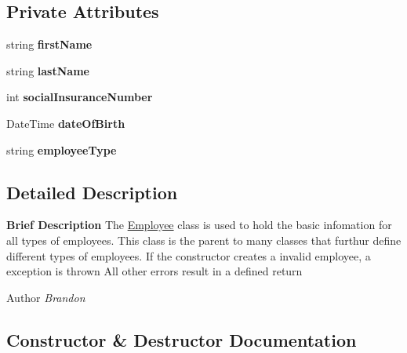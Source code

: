 \subsection*{Private Attributes}
\begin{DoxyCompactItemize}
\item 
\hypertarget{class_all_employees_1_1_employee_a04c4c16015aa2d889fd2042ce4b8a1d7}{}string {\bfseries first\+Name}\label{class_all_employees_1_1_employee_a04c4c16015aa2d889fd2042ce4b8a1d7}

\item 
\hypertarget{class_all_employees_1_1_employee_ac3721b61919ca9cd29a400620562170e}{}string {\bfseries last\+Name}\label{class_all_employees_1_1_employee_ac3721b61919ca9cd29a400620562170e}

\item 
\hypertarget{class_all_employees_1_1_employee_a31f55bb91fe0871c5d9a3cb77f44a4df}{}int {\bfseries social\+Insurance\+Number}\label{class_all_employees_1_1_employee_a31f55bb91fe0871c5d9a3cb77f44a4df}

\item 
\hypertarget{class_all_employees_1_1_employee_a00f33298e4408f0a0402a34c9aa2067a}{}Date\+Time {\bfseries date\+Of\+Birth}\label{class_all_employees_1_1_employee_a00f33298e4408f0a0402a34c9aa2067a}

\item 
\hypertarget{class_all_employees_1_1_employee_a246198254823dc5a10197029b17479b4}{}string {\bfseries employee\+Type}\label{class_all_employees_1_1_employee_a246198254823dc5a10197029b17479b4}

\end{DoxyCompactItemize}


\subsection{Detailed Description}
{\bfseries Brief Description} The \hyperlink{class_all_employees_1_1_employee}{Employee} class is used to hold the basic infomation for all types of employees. This class is the parent to many classes that furthur define different types of employees. If the constructor creates a invalid employee, a exception is thrown All other errors result in a defined return 

\begin{DoxyAuthor}{Author}
{\itshape Brandon} 
\end{DoxyAuthor}


\subsection{Constructor \& Destructor Documentation}
\hypertarget{class_all_employees_1_1_employee_ac3aa5a59bf1ddba2c45cc933bf897e04}{}
